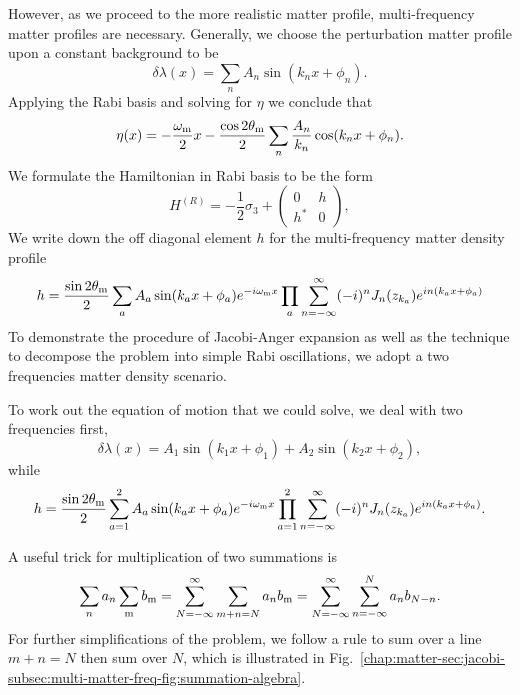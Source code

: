 However, as we proceed to the more realistic matter profile, multi-frequency matter profiles are necessary. Generally, we choose the perturbation matter profile upon a constant background to be
\begin{equation}
   \delta \lambda(x) = \sum_n A_n \sin (k_n x + \phi_n).
\end{equation}
Applying the Rabi basis and solving for $\eta$ we conclude that
\begin{equation}
   \eta(x) = - \frac{\omega_\mathrm m}{2}x - \frac{\cos 2\theta_\mathrm m}{2} \sum_n \frac{A_n}{k_n} \cos ( k_n x+ \phi_n ).
\end{equation}
We formulate the Hamiltonian in Rabi basis to be the form
\begin{equation}
    H^{(R)} = -\frac{1}{2}\sigma_3 + \begin{pmatrix}
    0 & h\\
    h^{*} & 0
    \end{pmatrix},
\end{equation}
We write down the off diagonal element $h$ for the multi-frequency matter density profile
\begin{equation}
   h = \frac{\sin 2\theta_\mathrm m}{2} \sum_a A_a \sin (k_a x + \phi_a) e^{-i\omega_\mathrm m x}\prod_{a} \sum_{n=-\infty}^{\infty} (-i)^n J_n (z_{k_a}) e^{i n(k_a x + \phi_a) }
\end{equation}
To demonstrate the procedure of Jacobi-Anger expansion as well as the technique to decompose the problem into simple Rabi oscillations, we adopt a two frequencies matter density scenario.


To work out the equation of motion that we could solve, we deal with two frequencies first,
\begin{equation}
   \delta \lambda ( x ) = A_1\sin (k_1 x + \phi_1) + A_2 \sin (k_2 x + \phi_2),
\end{equation}
while
\begin{equation}
   h = \frac{\sin 2\theta_\mm}{2} \sum_{a = 1}^2 A_a \sin (k_a x + \phi_a) e^{-i\omega_\mm x}\prod_{a=1}^2 \sum_{n=-\infty}^{\infty} (-i)^n J_n (z_{k_a}) e^{i n(k_a x + \phi_a) }.
   \label{chap:matter-sec:jacobi-subsec:multi-matter-freq-eqn:rabi-hamil-off}
\end{equation}

A useful trick for multiplication of two summations is
\begin{equation}
  \sum_n a_n \sum_\mm b_\mm  = \sum_{N = -\infty}^{\infty} \sum_{m+n=N} a_n b_\mm = \sum_{N=-\infty}^\infty \sum_{n=-\infty}^{N} a_n b_{N-n}.
  \label{chap:matter-sec:jacobi-subsec:multi-matter-freq-eqn:multiplication-summation-rule}
\end{equation}
For further simplifications of the problem, we follow a rule to sum over a line $m+n=N$ then sum over $N$, which is illustrated in Fig.~\ref{chap:matter-sec:jacobi-subsec:multi-matter-freq-fig:summation-algebra}.

